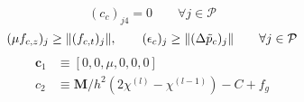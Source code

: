 \documentclass[a4paper,10pt]{article}
\begin{document}
\begin{landscape}
\begin{equation}
(c_c)_{j4} = 0  \quad\quad \forall j \in \mathcal{P}
\end{equation}
\begin{equation}\notag
(\mu f_{c,z})_j  \geq \| (f_{c,t})_j         \| , \quad\quad
(\epsilon_{c})_j    \geq \| (\Delta \tilde{p}_{c})_j      \| \quad\quad \forall j \in \mathcal{P}
\end{equation}
\begin{align*}
\mathbf{c}_1      & \equiv [ 0, 0, \mu, 0, 0, 0 ]\\
c_2               & \equiv \mathbf{M}/h^2(2\chi^{(l)}-\chi^{(l-1)}) - C + f_g
\end{align*}
\end{landscape}

\pagebreak

\newcommand{\eyemuscle}{\ensuremath{
\begin{bmatrix}
\mathbf{0} & -\mathbf{1}
\end{bmatrix}
}}
\end{document}
